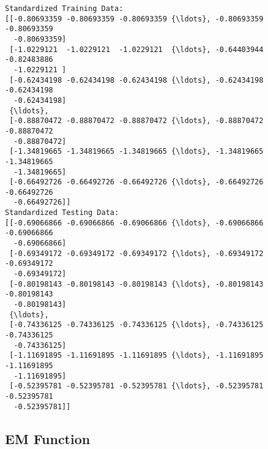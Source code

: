 \documentclass[11pt]{article}
\begin{document}
    \begin{Verbatim}[commandchars=\\\{\}]
Standardized Training Data: 
[[-0.80693359 -0.80693359 -0.80693359 {\ldots}, -0.80693359 -0.80693359
  -0.80693359]
 [-1.0229121  -1.0229121  -1.0229121  {\ldots}, -0.64403944 -0.82483886
  -1.0229121 ]
 [-0.62434198 -0.62434198 -0.62434198 {\ldots}, -0.62434198 -0.62434198
  -0.62434198]
 {\ldots}, 
 [-0.88870472 -0.88870472 -0.88870472 {\ldots}, -0.88870472 -0.88870472
  -0.88870472]
 [-1.34819665 -1.34819665 -1.34819665 {\ldots}, -1.34819665 -1.34819665
  -1.34819665]
 [-0.66492726 -0.66492726 -0.66492726 {\ldots}, -0.66492726 -0.66492726
  -0.66492726]]
Standardized Testing Data: 
[[-0.69066866 -0.69066866 -0.69066866 {\ldots}, -0.69066866 -0.69066866
  -0.69066866]
 [-0.69349172 -0.69349172 -0.69349172 {\ldots}, -0.69349172 -0.69349172
  -0.69349172]
 [-0.80198143 -0.80198143 -0.80198143 {\ldots}, -0.80198143 -0.80198143
  -0.80198143]
 {\ldots}, 
 [-0.74336125 -0.74336125 -0.74336125 {\ldots}, -0.74336125 -0.74336125
  -0.74336125]
 [-1.11691895 -1.11691895 -1.11691895 {\ldots}, -1.11691895 -1.11691895
  -1.11691895]
 [-0.52395781 -0.52395781 -0.52395781 {\ldots}, -0.52395781 -0.52395781
  -0.52395781]]

    \end{Verbatim}

    \subsection{EM Function}\label{em-function}
\end{document}
